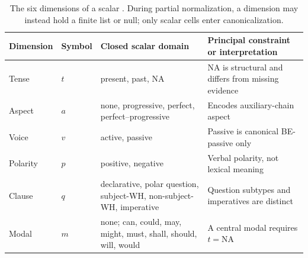 \begin{table}[t]
  \centering
  \small
  \begin{tabularx}{\textwidth}{@{}lllX@{}}
    \toprule
    Dimension & Symbol & Closed scalar domain & Principal constraint or interpretation \\
    \midrule
    Tense & $t$ & present, past, NA & NA is structural and differs from missing evidence \\
    Aspect & $a$ & none, progressive, perfect, perfect--progressive & Encodes auxiliary-chain aspect \\
    Voice & $v$ & active, passive & Passive is canonical BE-passive only \\
    Polarity & $p$ & positive, negative & Verbal polarity, not lexical meaning \\
    Clause & $q$ & declarative, polar question, subject-WH, non-subject-WH, imperative &
      Question subtypes and imperatives are distinct \\
    Modal & $m$ & none; can, could, may, might, must, shall, should, will, would &
      A central modal requires $t=\mathrm{NA}$ \\
    \bottomrule
  \end{tabularx}
  \caption{The six dimensions of a scalar \grammarcell.  During partial
  normalization, a dimension may instead hold a finite list or null; only
  scalar cells enter canonicalization.}
  \label{tab:grammar-domains}
\end{table}
